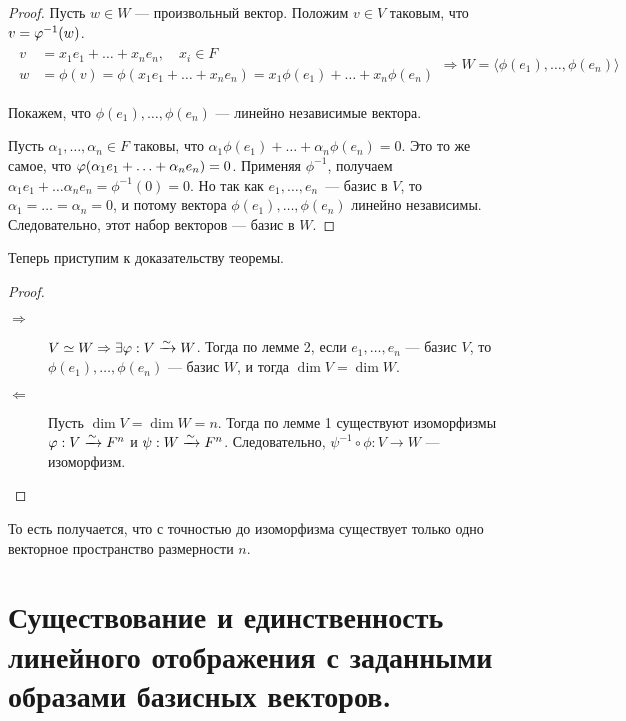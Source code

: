 \begin{proof}
Пусть $w \in W$ --- произвольный вектор. Положим $v \in V$ таковым, что $v \hm= \phi^{-1}(w)$.
\begin{gather*}
\begin{aligned}
v &= x_1e_1 + \ldots + x_ne_n, \quad x_i \in F \\
w &= \phi(v) = \phi(x_1e_1 + \ldots + x_ne_n) = x_1\phi(e_1) + \ldots + x_n\phi(e_n)
\end{aligned} \Rightarrow W = \langle \phi(e_1), \ldots, \phi(e_n)\rangle
\end{gather*}

Покажем, что $\phi(e_1), \ldots, \phi(e_n)$ --- линейно независимые вектора.

Пусть $\alpha_1, \ldots, \alpha_n \in F$ таковы, что $\alpha_1\phi(e_1) + \ldots + \alpha_n\phi(e_n) = 0$. Это то же самое, что $\phi(\alpha_1 e_1 \hm+ \ldots + \alpha_n e_n) = 0$. Применяя $\phi^{-1}$, получаем $\alpha_1 e_1 + \ldots \alpha_n e_n = \phi^{-1}(0) = 0$. Но так как $e_1, \ldots, e_n$~--- базис в $V$, то $\alpha_1 = \ldots= \alpha_n = 0$, и потому вектора $\phi(e_1), \ldots, \phi(e_n)$ линейно независимы. Следовательно, этот набор векторов --- базис в $W$.
\end{proof}

Теперь приступим к доказательству теоремы.
\begin{proof} \ 
\begin{description}
\item[$\Rightarrow$] $V \simeq W \Rightarrow \exists \varphi: V \xrightarrow{\sim} W$. Тогда по лемме 2, если $e_1, \ldots, e_n$ --- базис $V$, то $\phi(e_1), \ldots, \phi(e_n)$ --- базис $W$, и тогда $\dim V = \dim W$.  
\item[$\Leftarrow$] Пусть $\dim V = \dim W = n$. Тогда по лемме 1 существуют изоморфизмы $\varphi: V \xrightarrow{\sim} F^n$ и $\psi : W \xrightarrow{\sim} F^n$. Следовательно, $\psi^{-1}\circ\phi: V \rightarrow W$ --- изоморфизм.
\end{description}
\end{proof}

То есть получается, что с точностью до изоморфизма существует только одно векторное пространство размерности $n$.

\section{Существование и единственность линейного отображения с заданными образами базисных векторов.}

